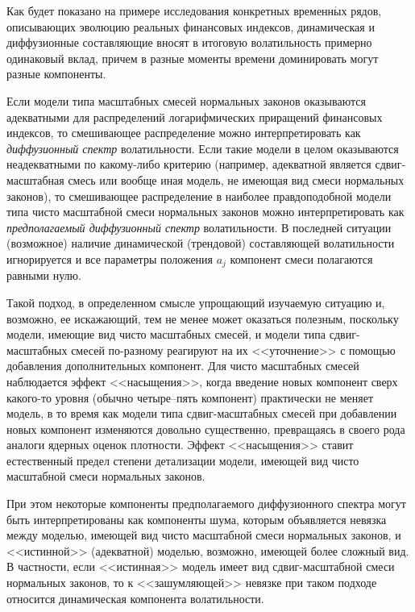 \begin{multicols}{2}
Как будет показано на примере исследования конкретных временн$\acute{\mbox{ы}}$х
рядов, описывающих эволюцию реальных финансовых индексов,
динамическая и диффузионные составляющие вносят в итоговую
волатильность примерно одинаковый вклад, причем в разные моменты
времени доминировать могут разные компоненты.

Если модели типа масштабных смесей нормальных законов оказываются
адекватными для распределений логарифмических приращений
финансовых индексов, то смешивающее распределение можно
интерпретировать как {\it диффузионный спектр} волатильности. Если
такие модели в целом оказываются неадекватными по какому-либо
критерию (например, адекватной является сдвиг-масштабная смесь или
вообще иная модель, не имеющая вид смеси нормальных законов), то
смешивающее распределение в наиболее правдоподобной модели типа
чисто масштабной смеси нормальных законов можно интерпретировать
как {\it предполагаемый диффузионный спектр} волатильности. В
последней ситуации (возможное) наличие динамической (трендовой)
составляющей волатильности игнорируется и все параметры положения
$a_j$ компонент смеси полагаются равными нулю.

Такой подход, в определенном смысле упрощающий изучаемую ситуацию
и, возможно, ее искажающий, тем не менее может оказаться полезным,
поскольку модели, имеющие вид чисто\linebreak
масштабных смесей, и модели
типа сдвиг-мас\-штаб\-ных смесей по-разному реагируют на их
<<уточнение>> с помощью добавления дополнительных компонент. Для
чисто масштабных смесей наблюдается эффект <<насыщения>>, когда
введение новых компонент сверх какого-то уровня (обычно
четыре--пять компонент) практически не меняет модель, в то время
как модели типа сдвиг-масштабных смесей при добавлении новых
компонент изменяются довольно существенно, превращаясь в своего
рода аналоги ядерных оценок плотности. Эффект <<насыщения>> ставит
естественный предел степени детализации модели, имеющей вид чисто
масштабной смеси нормальных законов.

При этом некоторые компоненты пред\-по\-ла\-га\-емо\-го диффузионного
спектра могут быть интерпретированы как компоненты шума, которым
объявляется невязка между моделью, имеющей вид чисто масштабной
смеси нормальных законов, и <<истинной>> (адекватной) моделью,
возможно, имеющей более сложный вид. В частности, если
<<истинная>> модель имеет вид сдвиг-масштабной смеси нормальных
законов, то к <<зашумляющей>> невязке при таком подходе относится
динамическая компонента волатильности.


\end{multicols}
